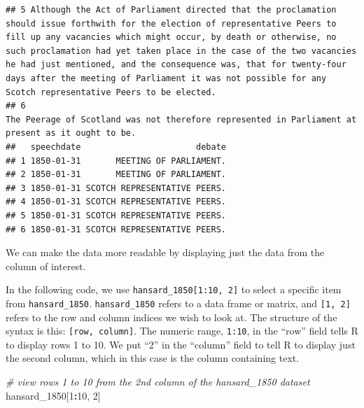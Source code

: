 \documentclass[
]{article}
\newenvironment{Shaded}{\begin{snugshade}}{\end{snugshade}}
\newcommand{\CommentTok}[1]{\textcolor[rgb]{0.56,0.35,0.01}{\textit{#1}}}
\newcommand{\DecValTok}[1]{\textcolor[rgb]{0.00,0.00,0.81}{#1}}
\newcommand{\NormalTok}[1]{#1}
\newcommand{\SpecialCharTok}[1]{\textcolor[rgb]{0.81,0.36,0.00}{\textbf{#1}}}
\begin{document}
\begin{verbatim}
## 5 Although the Act of Parliament directed that the proclamation should issue forthwith for the election of representative Peers to fill up any vacancies which might occur, by death or otherwise, no such proclamation had yet taken place in the case of the two vacancies he had just mentioned, and the consequence was, that for twenty-four days after the meeting of Parliament it was not possible for any Scotch representative Peers to be elected.
## 6                                                                                                                                                                                                                                                                                                                                                           The Peerage of Scotland was not therefore represented in Parliament at present as it ought to be.
##   speechdate                       debate
## 1 1850-01-31       MEETING OF PARLIAMENT.
## 2 1850-01-31       MEETING OF PARLIAMENT.
## 3 1850-01-31 SCOTCH REPRESENTATIVE PEERS.
## 4 1850-01-31 SCOTCH REPRESENTATIVE PEERS.
## 5 1850-01-31 SCOTCH REPRESENTATIVE PEERS.
## 6 1850-01-31 SCOTCH REPRESENTATIVE PEERS.
\end{verbatim}

We can make the data more readable by displaying just the data from the
column of interest.

In the following code, we use \texttt{hansard\_1850{[}1:10,\ 2{]}} to
select a specific item from \texttt{hansard\_1850}.
\texttt{hansard\_1850} refers to a data frame or matrix, and
\texttt{{[}1,\ 2{]}} refers to the row and column indices we wish to
look at. The structure of the syntax is this:
\texttt{{[}row,\ column{]}}. The numeric range, \texttt{1:10}, in the
``row'' field tells R to display rows 1 to 10. We put ``2'' in the
``column'' field to tell R to display just the second column, which in
this case is the column containing text.

\begin{Shaded}
\begin{Highlighting}[]
\CommentTok{\# view rows 1 to 10 from the 2nd column of the hansard\_1850 dataset}
\NormalTok{hansard\_1850[}\DecValTok{1}\SpecialCharTok{:}\DecValTok{10}\NormalTok{, }\DecValTok{2}\NormalTok{]}
\end{Highlighting}
\end{Shaded}
\end{document}
